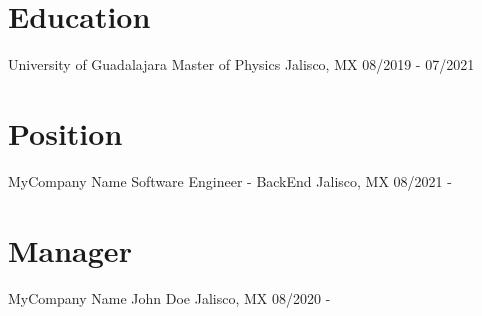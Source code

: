 \vspace{-\acvSectionTopSkip}

\section{Education}
\cventry
{University of Guadalajara} %
{Master of Physics} %
{Jalisco, MX} %
{08/2019 - 07/2021} %

\section{Position}
\cventry
{MyCompany Name} %
{Software Engineer - BackEnd} %
{Jalisco, MX} %
{08/2021 - } %

\section{Manager}
\cventry
{MyCompany Name} %
{John Doe} %
{Jalisco, MX} %
{08/2020 - } %

